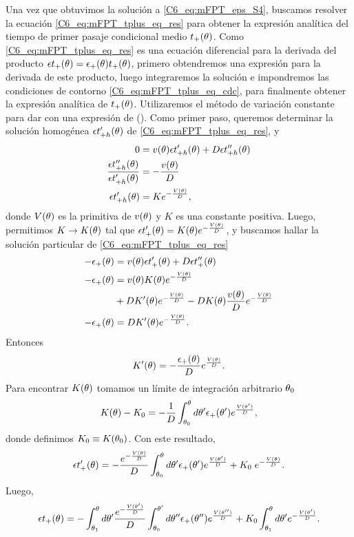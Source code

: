 \documentclass[./main.tex]{subfiles}
\begin{document}
Una vez que obtuvimos la solución a \ref{C6_eq:mFPT_eps_S4}, buscamos resolver la ecuación \ref{C6_eq:mFPT_tplus_eq_res} para obtener la expresión analítica del tiempo de primer pasaje condicional medio $t_{+}(\theta)$. Como \ref{C6_eq:mFPT_tplus_eq_res} es una ecuación diferencial para la derivada del producto $ \epsilon t_+(\theta) = \epsilon_{+}(\theta) t_{+}(\theta) $,  primero obtendremos una expresión para la derivada de este producto, luego integraremos la solución e impondremos las condiciones de contorno \ref{C6_eq:mFPT_tplus_eq_cdc}, para finalmente obtener la expresión analítica de  $t_{+}(\theta)$. Utilizaremos el método de variación constante para dar con una expresión de \Depstplus(\xx). Como primer paso, queremos determinar la solución homogénea $\epsilon t_{+h} '(\theta)$ de \ref{C6_eq:mFPT_tplus_eq_res}, y
\begin{align}
    0 &= v(\theta) \epsilon t_{+h} '(\theta)  + D \epsilon t_{+h} ''(\theta)\\
    \frac{\epsilon t_{+h} ''(\theta)}{\epsilon t_{+h} '(\theta)} &= - \frac{v(\theta)}{D} \\
    \epsilon t_{+h} '(\theta) & = K  e^{- \frac{V(\theta)}{D}},
\end{align}
donde $V(\theta)$ es la primitiva de $v(\theta)$ y $K$ es una constante positiva.
Luego, permitimos $K \rightarrow   K(\theta)$ tal que $\epsilon t_+ '(\theta) = K(\theta) e^{- \frac{V(\theta)}{D}}$, y buscamos hallar la solución particular de \ref{C6_eq:mFPT_tplus_eq_res}
\begin{align}
    - \epsilon_{+}(\theta) &= v(\theta) \epsilon t_+ '(\theta) + D \epsilon t_+ ''(\theta)\\
    - \epsilon_{+}(\theta) &= v(\theta) K(\theta) e^{- \frac{V(\theta)}{D}}  \nonumber \\
    & + D K'(\theta)e^{- \frac{V(\theta)}{D}} - D K(\theta) \frac{v(\theta)}{D} e^{- \frac{V(\theta)}{D}} \\
    - \epsilon_{+}(\theta) &=  D K'(\theta)e^{- \frac{V(\theta)}{D}} .
\end{align}
Entonces
\begin{align}
         K'(\theta) = - \frac{\epsilon_{+}(\theta)}{D} e^{ \frac{V(\theta)}{D}} .
\end{align}
Para encontrar $K(\theta)$ tomamos un límite de integración arbitrario $\theta_{0}$
\begin{align}
         K(\theta) - K_0 = - \frac{1}{D} \int_{\theta_0}^\theta d\theta' \epsilon_{+}(\theta') e^{ \frac{V(\theta')}{D}},
\end{align}
donde definimos $K_0 \equiv K(\theta_0)$. Con este resultado, 
\begin{align}
    \epsilon t_+ '(\theta) = - \frac{e^{- \frac{V(\theta)}{D}}}{D} \int_{\theta_0}^\theta d\theta' \epsilon_{+}(\theta') e^{ \frac{V(\theta')}{D}} + K_0 \; e^{- \frac{V(\theta)}{D}} .
\end{align}
Luego, 
\begin{align}
   \epsilon t_+(\theta) = - \int_{\theta_1}^{\theta} d\theta'  \frac{ e^{- \frac{V(\theta')}{D}} }{D} \int_{\theta_0}^{\theta'} d \theta'' \epsilon_{+}(\theta'') e^{ \frac{V(\theta'')}{D}} + K_0 \int_{\theta_1}^{\theta} d\theta'  e^{- \frac{V(\theta')}{D}}  .
\end{align}
\end{document}
